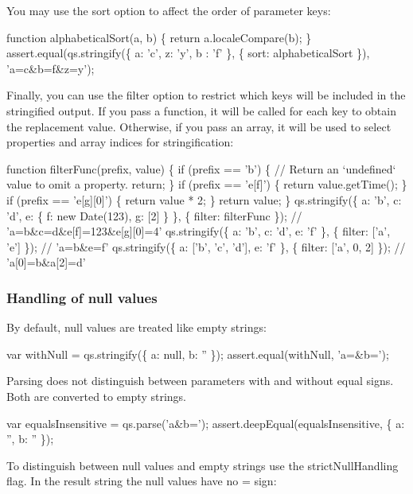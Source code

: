 You may use the {\ttfamily sort} option to affect the order of parameter keys\+:


\begin{DoxyCode}
function alphabeticalSort(a, b) \{
    return a.localeCompare(b);
\}
assert.equal(qs.stringify(\{ a: 'c', z: 'y', b : 'f' \}, \{ sort: alphabeticalSort \}), 'a=c&b=f&z=y');
\end{DoxyCode}


Finally, you can use the {\ttfamily filter} option to restrict which keys will be included in the stringified output. If you pass a function, it will be called for each key to obtain the replacement value. Otherwise, if you pass an array, it will be used to select properties and array indices for stringification\+:


\begin{DoxyCode}
function filterFunc(prefix, value) \{
    if (prefix == 'b') \{
        // Return an `undefined` value to omit a property.
        return;
    \}
    if (prefix == 'e[f]') \{
        return value.getTime();
    \}
    if (prefix == 'e[g][0]') \{
        return value * 2;
    \}
    return value;
\}
qs.stringify(\{ a: 'b', c: 'd', e: \{ f: new Date(123), g: [2] \} \}, \{ filter: filterFunc \});
// 'a=b&c=d&e[f]=123&e[g][0]=4'
qs.stringify(\{ a: 'b', c: 'd', e: 'f' \}, \{ filter: ['a', 'e'] \});
// 'a=b&e=f'
qs.stringify(\{ a: ['b', 'c', 'd'], e: 'f' \}, \{ filter: ['a', 0, 2] \});
// 'a[0]=b&a[2]=d'
\end{DoxyCode}


\subsubsection*{Handling of {\ttfamily null} values}

By default, {\ttfamily null} values are treated like empty strings\+:


\begin{DoxyCode}
var withNull = qs.stringify(\{ a: null, b: '' \});
assert.equal(withNull, 'a=&b=');
\end{DoxyCode}


Parsing does not distinguish between parameters with and without equal signs. Both are converted to empty strings.


\begin{DoxyCode}
var equalsInsensitive = qs.parse('a&b=');
assert.deepEqual(equalsInsensitive, \{ a: '', b: '' \});
\end{DoxyCode}


To distinguish between {\ttfamily null} values and empty strings use the {\ttfamily strict\+Null\+Handling} flag. In the result string the {\ttfamily null} values have no {\ttfamily =} sign\+:



